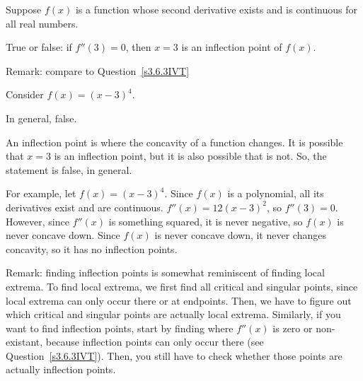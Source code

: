 \begin{question}\label{s3.6.3converse}
Suppose $f(x)$ is a function whose second derivative exists and is continuous for all real numbers.

True or false: if $f''(3)=0$, then $x=3$ is an inflection point of $f(x)$.

Remark: compare to Question~\ref{s3.6.3IVT}
\end{question}
\begin{hint}
Consider $f(x)=(x-3)^4$.
\end{hint}
\begin{answer}
In general, false.
\end{answer}
\begin{solution}
An inflection point is where the concavity of a function changes. It is possible that $x=3$ is an inflection point, but it is also possible that is not. So, the statement is false, in general.

For example, let $f(x)=(x-3)^4$. Since $f(x)$ is a polynomial, all its derivatives exist and are continuous. $f''(x)=12(x-3)^2$, so $f''(3)=0$. However, since $f''(x)$ is something squared, it is never negative, so $f(x)$ is never concave down. Since $f(x)$ is never concave down, it never changes concavity, so it has no inflection points.

Remark: finding inflection points is somewhat reminiscent of finding local extrema. To find local extrema, we first find all critical and singular points, since local extrema can only occur there or at endpoints. Then, we have to figure out which critical and singular points are actually local extrema. Similarly, if you want to find inflection points, start by finding where $f''(x)$ is zero or non-existant, because inflection points can only occur there (see Question~\ref{s3.6.3IVT}). Then, you still have to check whether those points are actually inflection points.
\end{solution}
\subsection*{\Procedural}


